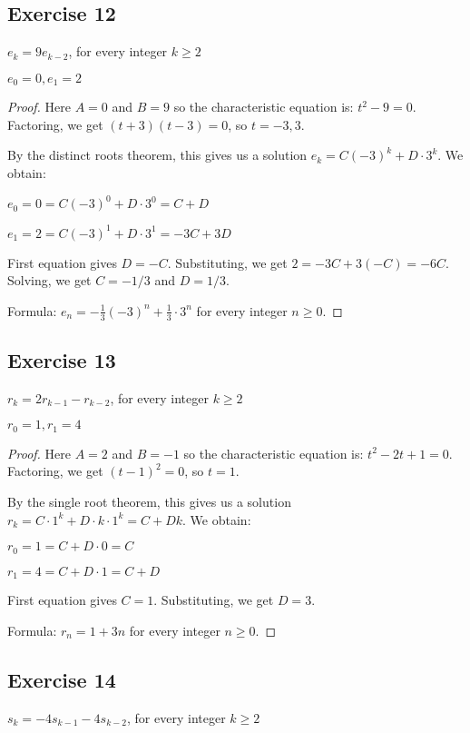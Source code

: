 \documentclass[14pt]{extarticle}
\begin{document}
\subsection{Exercise 12}
\(e_k = 9e_{k-2}\), for every integer \(k \geq 2\)

\(e_0 = 0, e_1 = 2\)

\begin{proof}
    Here $A = 0$ and $B = 9$ so the characteristic equation is: \(t^2 - 9 = 0\).
    Factoring, we get \((t + 3)(t - 3) = 0\), so $t = -3, 3$.

    By the distinct roots theorem, this gives us a solution \(e_k = C(-3)^k + D \cdot 3^k\). We obtain:

    \(e_0 = 0 = C(-3)^0 + D \cdot 3^0 = C + D\)

    \(e_1 = 2 = C(-3)^1 + D \cdot 3^1 = -3C + 3D\)

    First equation gives $D = - C$. Substituting, we get \(2 = -3C + 3(- C) = -6C\). Solving, we get $C = -1/3$ and $D = 1/3$.

    Formula: \(e_n = -\frac{1}{3}(-3)^n + \frac{1}{3} \cdot 3^n\) for every integer \(n \geq 0\).
\end{proof}

\subsection{Exercise 13}
\(r_k = 2r_{k-1} - r_{k-2}\), for every integer \(k \geq 2\)

\(r_0 = 1, r_1 = 4\)

\begin{proof}
    Here $A = 2$ and $B = -1$ so the characteristic equation is: \(t^2 - 2t +1 = 0\).
    Factoring, we get \((t - 1)^2 = 0\), so $t = 1$.

    By the single root theorem, this gives us a solution \(r_k = C \cdot 1^k + D \cdot k \cdot 1^k = C + Dk\). We obtain:

    \(r_0 = 1 = C + D \cdot 0 = C\)

    \(r_1 = 4 = C + D \cdot 1 = C + D\)

    First equation gives $C = 1$. Substituting, we get $D = 3$.

    Formula: \(r_n = 1 + 3n\) for every integer \(n \geq 0\).
\end{proof}

\subsection{Exercise 14}
\(s_k = -4s_{k-1} - 4s_{k-2}\), for every integer \(k \geq 2\)
\end{document}
